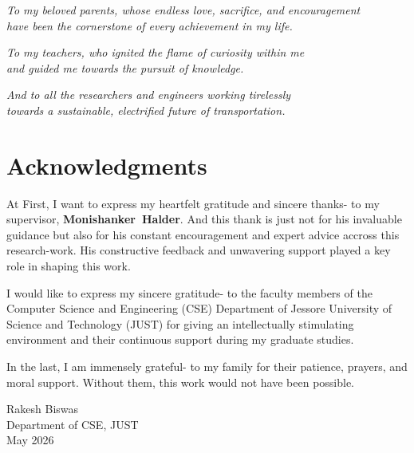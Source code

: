 \documentclass{thesis-library}
\begin{document}
\vspace{2cm}
\begin{center}
\textit{To my beloved parents, whose endless love, sacrifice, and encouragement\\
have been the cornerstone of every achievement in my life.}

\vspace{1cm}
\textit{To my teachers, who ignited the flame of curiosity within me\\
and guided me towards the pursuit of knowledge.}

\vspace{1cm}
\textit{And to all the researchers and engineers working tirelessly\\
towards a sustainable, electrified future of transportation.}
\end{center}

\chapter*{Acknowledgments}

\begin{sloppypar}
At First, I want to express my heartfelt gratitude and sincere thanks- to my supervisor, \mbox{\textbf{Monishanker Halder}}. And this thank is just not for his invaluable guidance but also for his constant encouragement and expert advice accross this research-work. His constructive feedback and unwavering support played a key role in shaping this work.
\end{sloppypar}

I would like to express my sincere gratitude- to the faculty members of the Computer Science and Engineering (CSE) Department of Jessore University of Science and Technology (JUST) for giving an intellectually stimulating environment and their continuous support during my graduate studies.

In the last, I am immensely grateful- to my family for their patience, prayers, and moral support. Without them, this work would not have been possible.

\vspace{1.5cm}
\begin{flushright}
Rakesh Biswas \\
Department of CSE, JUST \\
May 2026
\end{flushright}
\end{document}
